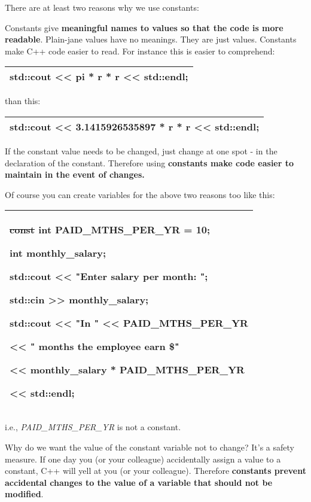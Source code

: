 \documentclass[
]{article}
\begin{document}
There are at least two reasons why we use constants:

Constants give \textbf{meaningful names to values so that the code is
more readable}. Plain-jane values have no meanings. They are just
values. Constants make C++ code easier to read. For instance this is
easier to comprehend:

\begin{longtable}[]{@{}l@{}}
\toprule
\endhead
std::cout \textless\textless{} pi * r * r \textless\textless{}
std::endl;\tabularnewline
\bottomrule
\end{longtable}

than this:

\begin{longtable}[]{@{}l@{}}
\toprule
\endhead
std::cout \textless\textless{} 3.1415926535897 * r * r
\textless\textless{} std::endl;\tabularnewline
\bottomrule
\end{longtable}

If the constant value needs to be changed, just change at one spot - in
the declaration of the constant. Therefore using \textbf{constants make
code easier to maintain in the event of changes.}

Of course you can create variables for the above two reasons too like
this:

\begin{longtable}[]{@{}l@{}}
\toprule
\endhead
\begin{minipage}[t]{0.97\columnwidth}\raggedright
\textbf{\sout{const} int PAID\_MTHS\_PER\_YR = 10};

int monthly\_salary;

std::cout \textless\textless{} "Enter salary per month: ";

std::cin \textgreater\textgreater{} monthly\_salary;

std::cout \textless\textless{} "In " \textless\textless{}
PAID\_MTHS\_PER\_YR

\textless\textless{} " months the employee earn \$"

\textless\textless{} monthly\_salary * PAID\_MTHS\_PER\_YR

\textless\textless{} std::endl;\strut
\end{minipage}\tabularnewline
\bottomrule
\end{longtable}

i.e., \emph{PAID\_MTHS\_PER\_YR} is not a constant.

Why do we want the value of the constant variable not to change? It's a
safety measure. If one day you (or your colleague) accidentally assign a
value to a constant, C++ will yell at you (or your colleague). Therefore
\textbf{constants prevent accidental changes to the value of a variable
that should not be modified}.
\end{document}
